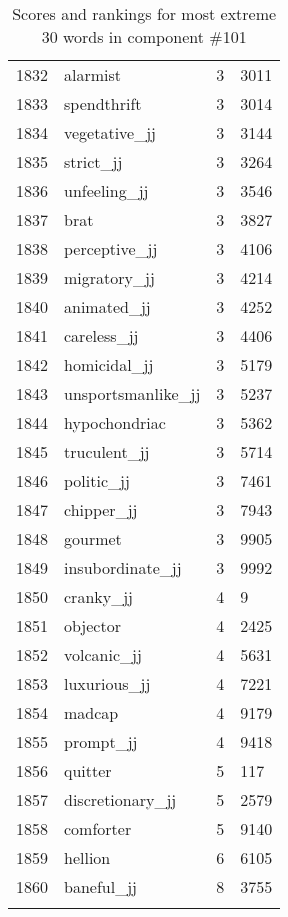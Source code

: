 \begin{longtable}[!htbp]{| rlr@{.}l |}
    1832 & alarmist & 3 & 3011 \\
    1833 & spendthrift & 3 & 3014 \\
    1834 & vegetative\_jj & 3 & 3144 \\
    1835 & strict\_jj & 3 & 3264 \\
    1836 & unfeeling\_jj & 3 & 3546 \\
    1837 & brat & 3 & 3827 \\
    1838 & perceptive\_jj & 3 & 4106 \\
    1839 & migratory\_jj & 3 & 4214 \\
    1840 & animated\_jj & 3 & 4252 \\
    1841 & careless\_jj & 3 & 4406 \\
    1842 & homicidal\_jj & 3 & 5179 \\
    1843 & unsportsmanlike\_jj & 3 & 5237 \\
    1844 & hypochondriac & 3 & 5362 \\
    1845 & truculent\_jj & 3 & 5714 \\
    1846 & politic\_jj & 3 & 7461 \\
    1847 & chipper\_jj & 3 & 7943 \\
    1848 & gourmet & 3 & 9905 \\
    1849 & insubordinate\_jj & 3 & 9992 \\
    1850 & cranky\_jj & 4 & 9 \\
    1851 & objector & 4 & 2425 \\
    1852 & volcanic\_jj & 4 & 5631 \\
    1853 & luxurious\_jj & 4 & 7221 \\
    1854 & madcap & 4 & 9179 \\
    1855 & prompt\_jj & 4 & 9418 \\
    1856 & quitter & 5 & 117 \\
    1857 & discretionary\_jj & 5 & 2579 \\
    1858 & comforter & 5 & 9140 \\
    1859 & hellion & 6 & 6105 \\
    1860 & baneful\_jj & 8 & 3755 \\
    \hline
    \caption{Scores and rankings for most extreme 30 words in component \#101} \\
\end{longtable}
